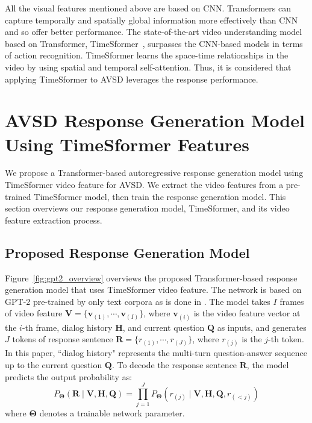 \documentclass[letterpaper]{article} %
\begin{document}
All the visual features mentioned above are based on CNN.
Transformers can capture temporally and spatially global information more effectively than CNN and so offer better performance.
The state-of-the-art video understanding model based on Transformer, TimeSformer~\cite{Bertasius2021is}, surpasses the CNN-based models in terms of action recognition. 
TimeSformer learns the space-time relationships in the video by using spatial and temporal self-attention.
Thus, it is considered that applying TimeSformer to AVSD leverages the response performance.


\section{AVSD Response Generation Model Using TimeSformer Features}
We propose a Transformer-based autoregressive response generation model using TimeSformer video feature for AVSD.
We extract the video features from a pre-trained TimeSformer model, then train the response generation model.
This section overviews our response generation model, TimeSformer, and its video feature extraction process.

\subsection{Proposed Response Generation Model}
Figure~\ref{fig:gpt2_overview} overviews the proposed Transformer-based response generation model that uses TimeSformer video feature.
The network is based on GPT-2 pre-trained by only text corpora as is done in \citet{Li2021bridging}.
The model takes $I$ frames of video feature $\bm{V} = \{\bm{v}_{(1)}, \cdots , \bm{v}_{(I)}\}$, where $\bm{v}_{(i)}$ is the video feature vector at the $i$-th frame, dialog history $\bm{H}$, and current question $\bm{Q}$ as inputs, and generates $J$ tokens of response sentence $\bm{R} = \{r_{(1)}, \cdots , r_{(J)}\}$, where $r_{(j)}$ is the $j$-th token.
In this paper, ``dialog history" represents the multi-turn question-answer sequence up to the current question $\bm{Q}$.
To decode the response sentence $\bm{R}$, the model predicts the output probability as:
\begin{equation}
  P_{\bm{\Theta}}(\bm{R} \mid \bm{V}, \bm{H}, \bm{Q}) = \prod^{J}_{j=1}P_{\bm{\Theta}}(r_{(j)} \mid \bm{V}, \bm{H}, \bm{Q}, r_{(<j)})
\end{equation}
where $\bm{\Theta}$ denotes a trainable network parameter.
\end{document}
